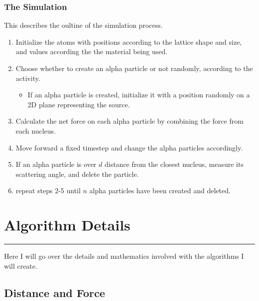 \documentclass[11pt]{article}
\providecommand{\tightlist}{%
      \setlength{\itemsep}{0pt}\setlength{\parskip}{0pt}}
\begin{document}
\hypertarget{the-simulation}{%
\subsubsection{The Simulation}\label{the-simulation}}

This describes the oultine of the simulation process.

\begin{enumerate}
\def\labelenumi{\arabic{enumi}.}
\tightlist
\item
  Initialize the atoms with positions according to the lattice shape and
  size, and values according the the material being used.
\item
  Choose whether to create an alpha particle or not randomly, according
  to the activity.

  \begin{itemize}
  \tightlist
  \item
    If an alpha particle is created, initialize it with a position
    randomly on a 2D plane representing the source.
  \end{itemize}
\item
  Calculate the net force on each alpha particle by combining the force
  from each nucleus.
\item
  Move forward a fixed timestep and change the alpha particles
  accordingly.
\item
  If an alpha particle is over \(d\) distance from the closest nucleus,
  measure its scattering angle, and delete the particle.
\item
  repeat steps 2-5 until \(n\) alpha particles have been created and
  deleted.
\end{enumerate}

    \hypertarget{algorithm-details}{%
\section{Algorithm Details}\label{algorithm-details}}

\begin{center}\rule{0.5\linewidth}{0.5pt}\end{center}

Here I will go over the details and mathematics involved with the
algorithms I will create.

    \hypertarget{distance-and-force}{%
\subsection{Distance and Force}\label{distance-and-force}}
\end{document}
